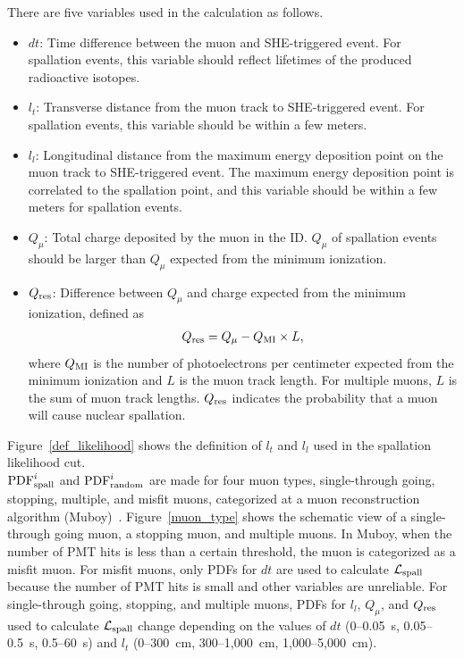 \hs
There are five variables used in the calculation as follows.
\begin{itemize}
	\item $dt$: Time difference between the muon and SHE-triggered event.
	For spallation events, this variable should reflect lifetimes of the produced radioactive isotopes.
	\item $l_{t}$: Transverse distance from the muon track to SHE-triggered event.
	For spallation events, this variable should be within a few meters.
	\item $l_{l}$: Longitudinal distance from the maximum energy deposition point on the muon track to SHE-triggered event.
	The maximum energy deposition point is correlated to the spallation point, and this variable should be within a few meters for spallation events. 
	\item $Q_{\mu}$: Total charge deposited by the muon in the ID.
	$Q_{\mu}$ of spallation events should be larger than $Q_{\mu}$ expected from the minimum ionization.
	\item $Q_{\rm res}$: Difference between $Q_{\mu}$ and charge expected from the minimum ionization, defined as
	\begin{eqnarray}
		Q_{\rm res} = Q_{\mu} - Q_{\rm MI} \times L,
	\end{eqnarray}
	where $Q_{\rm MI}$ is the number of photoelectrons per centimeter expected from the minimum ionization and $L$ is the muon track length.
	For multiple muons, $L$ is the sum of muon track lengths.
	$Q_{\rm res}$ indicates the probability that a muon will cause nuclear spallation.
\end{itemize}
Figure~\ref{def_likelihood} shows the definition of $l_{t}$ and $l_{l}$ used in the spallation likelihood cut.\\
\hs
${\rm PDF}^{i}_{\rm spall}$ and ${\rm PDF}^{i}_{\rm random}$ are made for four muon types, single-through going, stopping, multiple, and misfit muons, categorized at a muon reconstruction algorithm (Muboy)~\cite{1997ConnerPhD,2004DesaiPhD,2023HaradaPhD}.
Figure~\ref{muon_type} shows the schematic view of a single-through going muon, a stopping muon, and multiple muons.
In Muboy, when the number of PMT hits is less than a certain threshold, the muon is categorized as a misfit muon.
For misfit muons, only PDFs for $dt$ are used to calculate $\mathcal{L}_{\rm spall}$ because the number of PMT hits is small and other variables are unreliable.
For single-through going, stopping, and multiple muons, PDFs for $l_{l}$, $Q_{\mu}$, and $Q_{\rm res}$ used to calculate $\mathcal{L}_{\rm spall}$ change depending on the values of $dt$ (0--0.05~s, 0.05--0.5~s, 0.5--60~s) and $l_{t}$ (0--300~cm, 300--1,000~cm, 1,000--5,000~cm).
